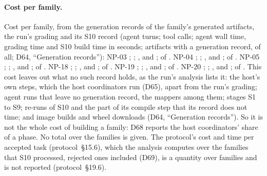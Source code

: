 \paragraph{Cost per family.}
Cost per family, from the generation records of the family's generated artifacts, the run's grading and its S10 record
(agent turns; tool calls; agent wall time, grading time and S10 build time in seconds; artifacts with a generation
record, of all; D64, ``Generation records''): NP-03 ; ;
,  and ;  of
. NP-04 ; ; ,
 and ;  of . NP-05
; ; ,  and ;
 of . NP-18 ; ;
,  and ;  of
. NP-19 ; ; ,
 and ;  of . NP-20
; ; ,  and ;
 of . This cost leaves out what no such record holds, as the run's
analysis lists it: the host's own steps, which the host coordinators run (D65), apart from the run's grading; agent runs
that leave no generation record, the mappers among them; stages S1 to S9; re-runs of S10 and the part of its compile
step that its record does not time; and image builds and wheel downloads (D64, ``Generation records''). So it is not the
whole cost of building a family: D68 reports the host coordinators' share of a phase. No total over the families is
given. The protocol's cost and time per accepted task (protocol~\S15.6), which the analysis computes over the families
that S10 processed, rejected ones included (D69), is a quantity over families and is not reported (protocol~\S19.6).

